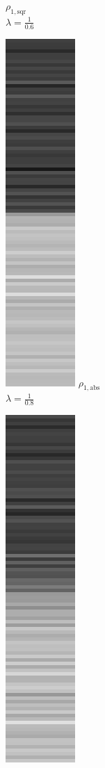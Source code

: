 \documentclass[onecolumn,final,a4paper,13pt,reqno]{siamart}
\begin{document}
\begin{figure}[t]
\begin{subfigure}[t]{0.08\textwidth}
		\scriptsize $\rho_{1,\text{sqr}}$\\[2px]
		\scriptsize $\lambda = \frac{1}{0.6}$
	\end{subfigure}
	\begin{subfigure}[t]{0.08\textwidth}
		\includegraphics[scale=0.3]{pictures/denoising/signal/ipiano_absolute_08.png}
		\scriptsize $\rho_{1,\text{abs}}$\\[2px]
		\scriptsize $\lambda = \frac{1}{0.8}$
	\end{subfigure}
	\begin{subfigure}[t]{0.08\textwidth}
		\includegraphics[scale=0.3]{pictures/denoising/signal/ipiano_squared_08.png}

\end{subfigure}
\end{figure}
\end{document}

